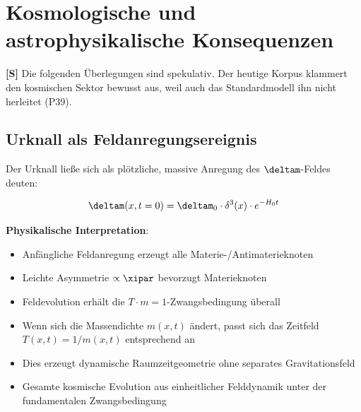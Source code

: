 	\begin{table}[htbp]
		\centering
		\caption{Vorhergesagte experimentelle Signaturen der Knotentheorie}
		\label{tab:experimental_signatures}
	\end{table}
	
	\section{Kosmologische und astrophysikalische Konsequenzen}
	
	\textbf{[S]} Die folgenden Überlegungen sind spekulativ. Der heutige Korpus klammert den kosmischen Sektor bewusst aus, weil auch das Standardmodell ihn nicht herleitet (P39).
	
	\subsection{Urknall als Feldanregungsereignis}
	
	Der Urknall ließe sich als plötzliche, massive Anregung des $\deltam$-Feldes deuten:
	
	\begin{equation}
		\deltam(x,t=0) = \deltam_0 \cdot \delta^3(x) \cdot e^{-H_0 t}
	\end{equation}
	
	\textbf{Physikalische Interpretation}:
	\begin{itemize}
		\item Anfängliche Feldanregung erzeugt alle Materie-/Antimaterieknoten
		\item Leichte Asymmetrie $\propto \xipar$ bevorzugt Materieknoten
		\item Feldevolution erhält die $T \cdot m = 1$-Zwangsbedingung überall
		\item Wenn sich die Massendichte $m(x,t)$ ändert, passt sich das Zeitfeld $T(x,t) = 1/m(x,t)$ entsprechend an
		\item Dies erzeugt dynamische Raumzeitgeometrie ohne separates Gravitationsfeld
		\item Gesamte kosmische Evolution aus einheitlicher Felddynamik unter der fundamentalen Zwangsbedingung
	\end{itemize}
	
